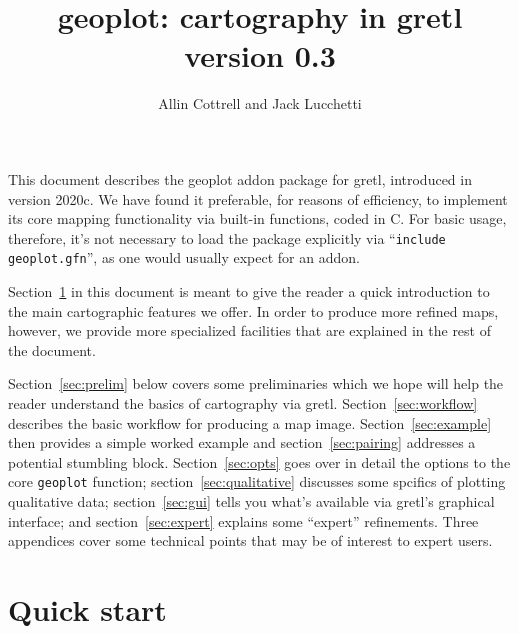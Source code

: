 \documentclass{article}
\title{geoplot: cartography in gretl\\ version 0.3}
\author{Allin Cottrell and Jack Lucchetti}
\begin{document}
\maketitle

This document describes the \textsf{geoplot} addon package for gretl,
introduced in version 2020c. We have found it preferable, for reasons
of efficiency, to implement its core mapping functionality via
built-in functions, coded in C. For basic usage, therefore, it's not
necessary to load the package explicitly via ``\texttt{include
  geoplot.gfn}'', as one would usually expect for an addon.

Section~\ref{sec:quick} in this document is meant to give the reader a
quick introduction to the main cartographic features we offer. In
order to produce more refined maps, however, we provide more
specialized facilities that are explained in the rest of the document.

Section~\ref{sec:prelim} below covers some preliminaries which we hope
will help the reader understand the basics of cartography via
gretl. Section~\ref{sec:workflow} describes the basic workflow for
producing a map image. Section~\ref{sec:example} then provides a
simple worked example and section~\ref{sec:pairing} addresses a
potential stumbling block. Section~\ref{sec:opts} goes over in detail
the options to the core \texttt{geoplot} function;
section~\ref{sec:qualitative} discusses some spcifics of plotting
qualitative data; section~\ref{sec:gui} tells you what's available via
gretl's graphical interface; and section~\ref{sec:expert} explains
some ``expert'' refinements. Three appendices cover some technical
points that may be of interest to expert users.

\section{Quick start}
\label{sec:quick}
\end{document}
